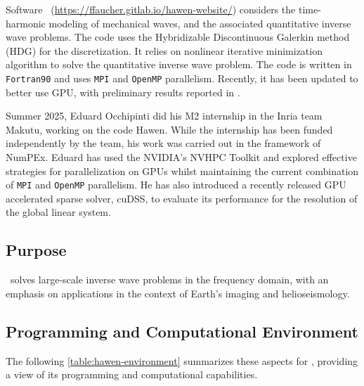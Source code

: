 Software \hawen~(\url{https://ffaucher.gitlab.io/hawen-website/})
considers the time-harmonic modeling of mechanical waves, and the 
associated quantitative inverse wave problems.
The code uses the Hybridizable Discontinuous Galerkin method (HDG) 
for the discretization. 
It relies on nonlinear iterative minimization algorithm to solve 
the quantitative inverse wave problem.
The code is written in \texttt{Fortran90} and uses \texttt{MPI}
and \texttt{OpenMP} parallelism.
Recently, it has been updated to better use GPU, with preliminary
results reported in \cite{zotero-item-4586}.

Summer 2025, Eduard Occhipinti did his M2 internship in the Inria team Makutu, 
working on the code Hawen. While the internship has been funded independently 
by the team, his work was carried out in the framework of NumPEx.
Eduard has used the NVIDIA's NVHPC Toolkit and explored effective strategies 
for parallelization on GPUs whilst maintaining the current combination of 
\texttt{MPI} and \texttt{OpenMP} parallelism.
He has also introduced a recently released GPU accelerated sparse solver, 
cuDSS, to evaluate its performance for the resolution of the global linear 
system.


\subsection{Purpose}
\label{sec:Hawen:purpose}

\hawen~solves large-scale inverse wave problems in the frequency domain, 
with an emphasis on applications in the context of Earth's imaging and helioseismology.


\subsection{Programming and Computational Environment}
\label{sec::Hawen:environment_capabilities}


The following \cref{table:hawen-environment} summarizes these aspects for \hawen, providing a  view of its programming and computational capabilities.

